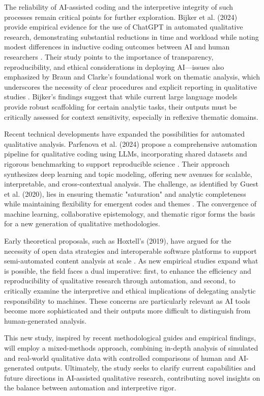 \documentclass[letterpaper,10pt]{article}
\begin{document}
The reliability of AI-assisted coding and the interpretive integrity of such processes remain critical points for further exploration. Bijker et al. (2024) provide empirical evidence for the use of ChatGPT in automated qualitative research, demonstrating substantial reductions in time and workload while noting modest differences in inductive coding outcomes between AI and human researchers \cite{Bijker2024}. Their study points to the importance of transparency, reproducibility, and ethical considerations in deploying AI—issues also emphasized by Braun and Clarke's foundational work on thematic analysis, which underscores the necessity of clear procedures and explicit reporting in qualitative studies \cite{BraunClarke2006}. Bijker's findings suggest that while current large language models provide robust scaffolding for certain analytic tasks, their outputs must be critically assessed for context sensitivity, especially in reflexive thematic domains.

Recent technical developments have expanded the possibilities for automated qualitative analysis. Parfenova et al. (2024) propose a comprehensive automation pipeline for qualitative coding using LLMs, incorporating shared datasets and rigorous benchmarking to support reproducible science \cite{Parfenova2024}. Their approach synthesizes deep learning and topic modeling, offering new avenues for scalable, interpretable, and cross-contextual analysis. The challenge, as identified by Guest et al. (2020), lies in ensuring thematic "saturation" and analytic completeness while maintaining flexibility for emergent codes and themes \cite{Guest2020}. The convergence of machine learning, collaborative epistemology, and thematic rigor forms the basis for a new generation of qualitative methodologies.

Early theoretical proposals, such as Hoxtell's (2019), have argued for the necessity of open data strategies and interoperable software platforms to support semi-automated content analysis at scale \cite{Hoxtell2019}. As new empirical studies expand what is possible, the field faces a dual imperative: first, to enhance the efficiency and reproducibility of qualitative research through automation, and second, to critically examine the interpretive and ethical implications of delegating analytic responsibility to machines. These concerns are particularly relevant as AI tools become more sophisticated and their outputs more difficult to distinguish from human-generated analysis.

This new study, inspired by recent methodological guides and empirical findings, will employ a mixed-methods approach, combining in-depth analysis of simulated and real-world qualitative data with controlled comparisons of human and AI-generated outputs. Ultimately, the study seeks to clarify current capabilities and future directions in AI-assisted qualitative research, contributing novel insights on the balance between automation and interpretive rigor.

\printbibliography %
\end{document}

